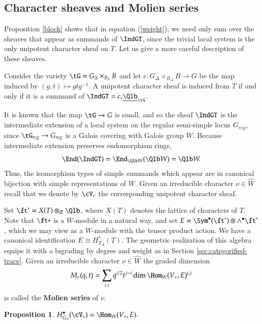 \documentclass[12pt]{amsart}
\def\to{\rightarrow}
\newtheorem{prop}[thm]{Proposition}
\theoremstyle{remark}
\begin{document}
\subsection{Character sheaves and Molien series}
\label{sec:char-sheav-moli}

Proposition \ref{block} shows that in equation (\ref{weight}), we need only sum over the sheaves
that appear as summands of $\IndGT$, since the trivial local system is
the only unipotent character sheaf on $T$.  Let us give a more careful description of these sheaves.

Consider the variety $\tG=G_\Delta\times_{B_\Delta}B$ and let
$c:G_\Delta\times_{B_\Delta}B\to G$ be the map induced by
$(g,t)\mapsto gtg^{-1}$.  A unipotent character sheaf is induced from $T$ if and only if it is a summand of $\IndGT=c_*\underline{\Qlb}_{\tG}$.

It is known that the map $\tG\to G$ is small, and so the sheaf $\IndGT$ is the intermediate extension of a local system on the regular semi-simple locus $G_{reg}$, since $\tG_{reg}\to G_{reg}$ is a Galois covering with Galois group $W$.  Because intermediate extension preserves endomorphism rings, 
\[
\End(\IndGT)=\End_{\Qlb W}(\Qlb W)=\Qlb W.
\] 
Thus, the isomorphism types of simple summands which appear are in canonical bijection with simple representations of $W$. Given an irreducible character $\nu \in \widehat W$ recall that we denote by $\cV_{\nu}$ the corresponding unipotent character sheaf.

Set $\ft^* = X(T) \otimes_{\mathbb{Z}} \Qlb$, where $X(T)$ denotes the lattice of characters of $T$. Note that $\ft*$ is a $W$-module in a natural way, and set $E = \Sym^\bullet(\ft^*)\otimes
\wedge^\bullet\ft^*$, which we may view as a $W$-module with the tensor product action. We have a canonical identification $E \cong H^*_{T_\Delta}(T)$.
The geometric realization of this algebra equips it with a bigrading by degree and weight as in Section \ref{sec:categorified-trace}. Given an irreducible character $\nu \in \widehat W$ the graded dimension
\[
M_\nu(q,t)=\sum_{i,j}q^{i/2}t^{j-i}\dim\Hom_W(V_\nu,E)^{i,j}
\]
is called the {\bf Molien series} of $\nu$.
\begin{prop}
\begin{math}
     \displaystyle H^\bullet_{G_\Delta}(\cV_\nu)= \Hom_W( V_{\nu}, E).
\end{math}
\end{prop}
\end{document}
